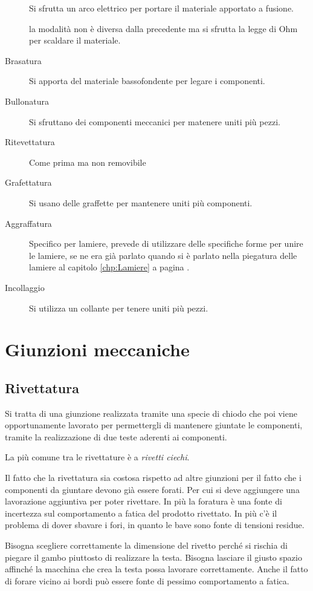 \begin{description}
\item[] Si sfrutta un arco elettrico per portare il materiale apportato a fusione.
\item[] la modalità non è diversa dalla precedente ma si sfrutta la legge di Ohm per scaldare il materiale.
\item[Brasatura] Si apporta del materiale bassofondente per legare i componenti.
\item[Bullonatura] Si sfruttano dei componenti meccanici per matenere uniti più pezzi.
\item[Ritevettatura] Come prima ma non removibile
\item[Grafettatura] Si usano delle graffette per mantenere uniti più componenti.
\item[Aggraffatura] Specifico per lamiere, prevede di utilizzare delle specifiche forme per unire le lamiere, se ne era già parlato quando si è parlato nella piegatura delle lamiere al capitolo \ref{chp:Lamiere} a pagina \pageref{chp:Lamiere}.
\item[Incollaggio] Si utilizza un collante per tenere uniti più pezzi.
\end{description}

\section{Giunzioni meccaniche}
\subsection{Rivettatura}
Si tratta di una giunzione realizzata tramite una specie di chiodo che poi viene opportunamente lavorato per permettergli di mantenere giuntate le componenti, tramite la realizzazione di due teste aderenti ai componenti.

La più comune tra le rivettature è a \emph{rivetti ciechi}.

Il fatto che la rivettatura sia costosa rispetto ad altre giunzioni per il fatto che i componenti da giuntare devono già essere forati. Per cui si deve aggiungere una lavorazione aggiuntiva per poter rivettare.
In più la foratura è una fonte di incertezza sul comportamento a fatica del prodotto rivettato.
In più c'è il problema di dover sbavare i fori, in quanto le bave sono fonte di tensioni residue.

Bisogna scegliere correttamente la dimensione del rivetto perché si rischia di piegare il gambo piuttosto di realizzare la testa.
Bisogna lasciare il giusto spazio affinché la macchina che crea la testa possa lavorare correttamente.
Anche il fatto di forare vicino ai bordi può essere fonte di pessimo comportamento a fatica.


